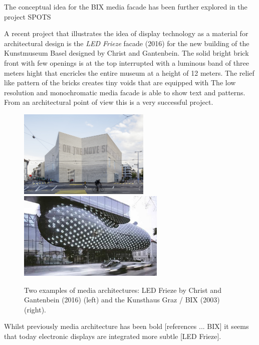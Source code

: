 The conceptual idea for the BIX media facade has been further explored in the project SPOTS 

A recent project that illustrates the idea of display technology as a material for architectural design is the \textit{LED Frieze} facade (2016)  for the new building of the Kunstmuseum Basel designed by Christ and Gantenbein. The solid bright brick front with few openings is at the top interrupted with a luminous band of three meters hight that encricles the entire museum at a height of 12 meters. The relief like pattern of the bricks creates tiny voids that are equipped with 
The low resolution and monochromatic media facade is able to show text and patterns. From an architectural point of view this is a very successful project.

\begin{figure}[htp]
\centering
\includegraphics[height=4.2cm]{Illustrations/LEDfrieze.jpg}
\includegraphics[height=4.2cm]{Illustrations/BIX.jpg}
\caption[Two examples of media architectures: LED Frieze by Christ and Gantenbein (2016) (left)]{Two examples of media architectures: LED Frieze by Christ and Gantenbein (2016) (left) and the Kunsthaus Graz / BIX (2003)(right).}
\label{LEDfrieze}
\end{figure}


Whilst previously media architecture has been bold [references ... BIX] it seems that today electronic displays are integrated more subtle [LED Frieze].



